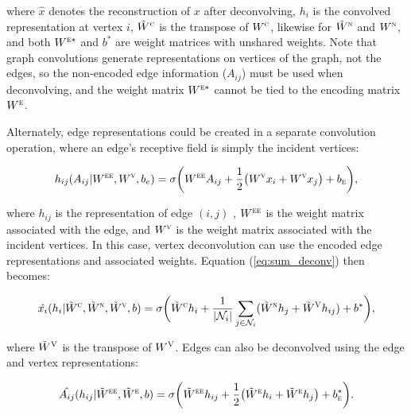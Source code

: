 \noindent
where $\hat{x}$ denotes the reconstruction of $x$ after deconvolving, $h_i$ is the convolved representation at vertex $i$, $\tilde{W}^\textsc{c}$ is the transpose of $W^\textsc{c}$, likewise for $\tilde{W}^\textsc{n}$ and $W^\textsc{n}$, and both $W^{\textsc{e}*}$ and $b^*$ are weight matrices with unshared weights. 
Note that graph convolutions generate representations on vertices of the graph, not the edges, so the non-encoded edge information ($A_{ij}$) must be used when deconvolving, and the weight matrix $W^{\textsc{e}*}$ cannot be tied to the encoding matrix $W^{\textsc{e}}$.

Alternately, edge representations could be created in a separate convolution operation, where an edge's receptive field is simply the incident vertices:

\begin{equation}
h_{ij}(A_{ij} |W^{\textsc{ee}}, W^{\textsc{v}}, b_e) = \sigma\bigg( W^{\textsc{ee}} A_{ij} + \frac{1}{2}\big(
W^{\textsc{v}} x_i + W^{\textsc{v}} x_j \big) + b_\textsc{e} \bigg),
\label{eq:edge_conv}
\end{equation}

\noindent
where $h_{ij}$ is the representation of edge $(i, j)$ , $W^{\textsc{ee}}$ is the weight matrix associated with the edge, and $W^{\textsc{v}}$ is the weight matrix associated with the incident vertices.
In this case, vertex deconvolution can use the encoded edge representations and associated weights.
Equation (\ref{eq:sum_deconv}) then becomes:

\begin{equation}
\hat{x_i}(h_i | \tilde{W}^\textsc{c}, \tilde{W}^\textsc{n}, \tilde{W}^\textsc{v}, b) = \sigma \bigg( \tilde{W}^{\textsc{c}} h_i + \frac{1}{|\mathcal{N}_i|}\sum_{j \in \mathcal{N}_i} (\tilde{W}^{\textsc{n}} h_j + \tilde{W}^{\textsc{V}} h_{ij}) + b^* \bigg),
\label{eq:sum_deconv2}
\end{equation}

\noindent
where $\tilde{W}^{\textsc{V}}$ is the transpose of $W^{\textsc{V}}$.
Edges can also be deconvolved using the edge and vertex representations:

\begin{equation}
\hat{A_{ij}}(h_{ij} |\tilde{W}^{\textsc{ee}}, \tilde{W}^{\textsc{e}}, b) = \sigma \bigg( \tilde{W}^{\textsc{ee}} h_{ij} + \frac{1}{2}\big(
\tilde{W}^{\textsc{e}} h_i + \tilde{W}^{\textsc{e}} h_j \big) + b^{*}_\textsc{e} \bigg).
\label{eq:edge_conv}
\end{equation}

